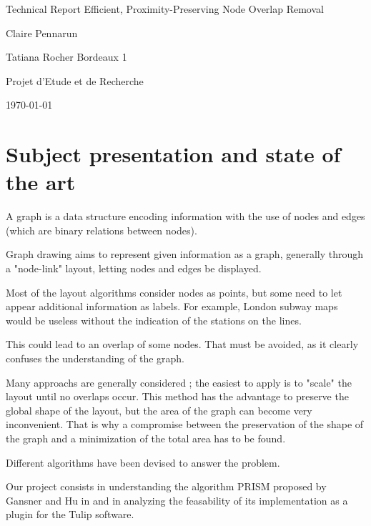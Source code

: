 \documentclass[12pt]{report}
\begin{document}
\begin{titlepage}
\begin{center}

\hfill

\bigskip
\huge{Technical Report} 
\vfill
\bigskip 
\Huge 
\bigskip Efficient, Proximity-Preserving Node Overlap Removal \par 
\vfill
\Large Claire Pennarun \par 
		Tatiana Rocher
\vfill
\Large Bordeaux 1 \par \Large Projet d'Etude et de Recherche		
		\bigskip 
\bigskip

\Large
\today
\end{center}
\end{titlepage}

\tableofcontents
\newpage


\chapter{Subject presentation and state of the art}

A graph is a data structure encoding information with the use of nodes and edges (which are binary relations between nodes).

Graph drawing aims to represent given information as a graph, generally through a "node-link" layout, letting nodes and edges be displayed. 

\bigskip
Most of the layout algorithms consider nodes as points, but some need to let appear additional information as labels. For example, London subway maps would be useless without the indication of the stations on the lines.

This could lead to an overlap of some nodes. That must be avoided, as it clearly confuses the understanding of the graph.

Many approachs are generally considered ; the easiest to apply is to "scale" the layout until no overlaps occur. This method has the advantage to preserve the global shape of the layout, but the area of the graph can become very inconvenient. That is why a compromise between the preservation of the shape of the graph and a minimization of the total area has to be found.

Different algorithms have been devised to answer the problem. 

\bigskip
Our project consists in understanding the algorithm PRISM proposed by Gansner and Hu in \cite{GH08} and in analyzing the feasability of its implementation as a plugin for the Tulip software. %
\end{document}
